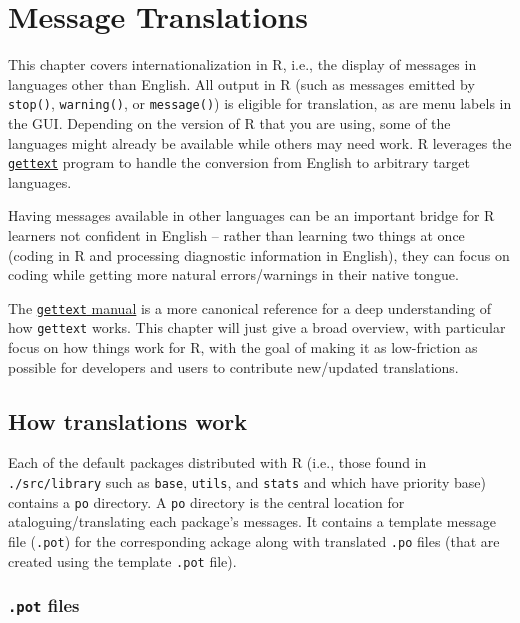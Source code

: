 \documentclass[
]{book}
\begin{document}
\chapter{Message Translations}\label{message-translations}

This chapter covers internationalization in R, i.e., the display of
messages in languages other than English. All output in R (such as
messages emitted by \texttt{stop()}, \texttt{warning()}, or \texttt{message()}) is eligible
for translation, as are menu labels in the GUI. Depending on the version
of R that you are using, some of the languages might already be
available while others may need work. R leverages the
\href{https://www.gnu.org/software/gettext/}{\texttt{gettext}} program to handle the
conversion from English to arbitrary target languages.

Having messages available in other languages can be an important bridge
for R learners not confident in English -- rather than learning two
things at once (coding in R and processing diagnostic information in
English), they can focus on coding while getting more natural
errors/warnings in their native tongue.

The \href{https://www.gnu.org/software/gettext/manual/index.html}{\texttt{gettext}
manual} is a
more canonical reference for a deep understanding of how \texttt{gettext}
works. This chapter will just give a broad overview, with particular
focus on how things work for R, with the goal of making it as
low-friction as possible for developers and users to contribute
new/updated translations.

\section{How translations work}\label{how-translations-work}

Each of the default packages distributed with R (i.e., those found in
\texttt{./src/library} such as \texttt{base}, \texttt{utils}, and \texttt{stats} and which have
priority base) contains a \texttt{po} directory. A \texttt{po} directory is the
central location for ataloguing/translating each package's messages. It
contains a template message file (\texttt{.pot}) for the corresponding ackage
along with translated \texttt{.po} files (that are created using the template
\texttt{.pot} file).

\subsection{\texorpdfstring{\texttt{.pot} files}{.pot files}}\label{pot-files}
\end{document}
